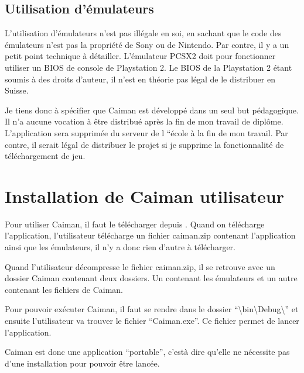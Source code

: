 \documentclass[a4paper,12pt,french]{sphinxmanual}
\begin{document}
\section{Utilisation d’émulateurs}
\label{\detokenize{resume:utilisation-demulateurs}}
\sphinxAtStartPar
L’utilisation d’émulateurs n’est pas illégale en soi, en sachant que le code des émulateurs n’est pas la propriété de Sony ou de Nintendo. Par contre, il y a un petit point technique à détailler. L’émulateur PCSX2 doit pour fonctionner utiliser un BIOS de console de Playstation 2. Le BIOS de la Playstation 2 étant soumis à des droits d’auteur, il n’est en théorie pas légal de le distribuer en Suisse.

\sphinxAtStartPar
Je tiens donc à spécifier que Caiman est développé dans un seul but pédagogique. Il n’a aucune vocation à être distribué après la fin de mon travail de diplôme. L’application sera supprimée du serveur de l “école à la fin de mon travail. Par contre, il serait légal de distribuer le projet si je supprime la fonctionnalité de téléchargement de jeu.


\chapter{Installation de Caiman utilisateur}
\label{\detokenize{resume:installation-de-caiman-utilisateur}}
\sphinxAtStartPar
Pour utiliser Caiman, il faut le télécharger depuis . Quand on télécharge l’application, l’utilisateur télécharge un fichier caiman.zip contenant l’application ainsi que les émulateurs, il n’y a donc rien d’autre à télécharger.

\sphinxAtStartPar
Quand l’utilisateur décompresse le fichier caiman.zip, il se retrouve avec un dossier Caiman contenant deux dossiers. Un contenant les émulateurs et un autre contenant les fichiers de Caiman.

\sphinxAtStartPar
{}

\sphinxAtStartPar
Pour pouvoir exécuter Caiman, il faut se rendre dans le dossier “\textbackslash{}bin\textbackslash{}Debug\textbackslash{}” et ensuite l’utilisateur va trouver le fichier “Caiman.exe”. Ce fichier permet de lancer l’application.

\sphinxAtStartPar
Caiman est donc une application “portable”, c’est\sphinxhyphen{}à\sphinxhyphen{} dire qu’elle ne nécessite pas d’une installation pour pouvoir être lancée.
\end{document}
